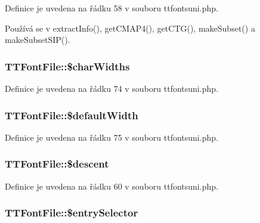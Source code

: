 Definice je uvedena na řádku 58 v souboru ttfontsuni.\-php.



Používá se v extract\-Info(), get\-C\-M\-A\-P4(), get\-C\-T\-G(), make\-Subset() a make\-Subset\-S\-I\-P().

\hypertarget{class_t_t_font_file_ac34aa61e131d41149069cd6a0c3abb63}{
\subsubsection[{\$char\-Widths}]{\setlength{\rightskip}{0pt plus 5cm}T\-T\-Font\-File\-::\$char\-Widths}}\label{class_t_t_font_file_ac34aa61e131d41149069cd6a0c3abb63}


Definice je uvedena na řádku 74 v souboru ttfontsuni.\-php.

\hypertarget{class_t_t_font_file_a824f8f04ba134a24a13b024c93470bad}{
\subsubsection[{\$default\-Width}]{\setlength{\rightskip}{0pt plus 5cm}T\-T\-Font\-File\-::\$default\-Width}}\label{class_t_t_font_file_a824f8f04ba134a24a13b024c93470bad}


Definice je uvedena na řádku 75 v souboru ttfontsuni.\-php.

\hypertarget{class_t_t_font_file_a5be94f69d8ae28c1a71cabbe18404853}{
\subsubsection[{\$descent}]{\setlength{\rightskip}{0pt plus 5cm}T\-T\-Font\-File\-::\$descent}}\label{class_t_t_font_file_a5be94f69d8ae28c1a71cabbe18404853}


Definice je uvedena na řádku 60 v souboru ttfontsuni.\-php.

\hypertarget{class_t_t_font_file_a498688f98429c7e7538cbee1b4d57f7b}{
\subsubsection[{\$entry\-Selector}]{\setlength{\rightskip}{0pt plus 5cm}T\-T\-Font\-File\-::\$entry\-Selector}}\label{class_t_t_font_file_a498688f98429c7e7538cbee1b4d57f7b}


